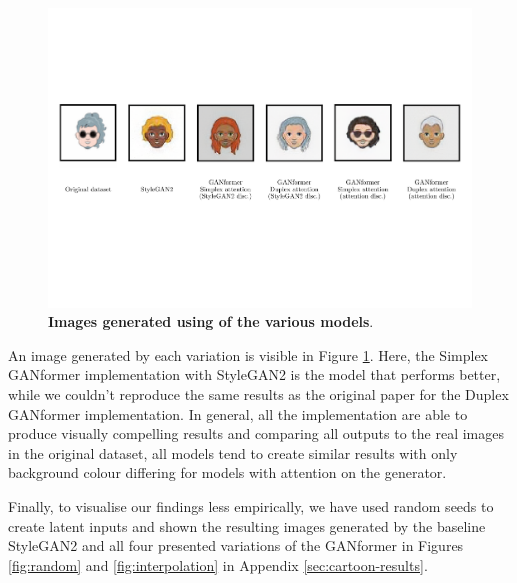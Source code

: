 \documentclass{article}
\begin{document}
\begin{figure}[htb]
	\centering
	\includegraphics[width=.9\linewidth]{imgAll}
	\caption{\textbf{Images generated using of the various models}.} 
	\label{fig:summaryImgs}
\end{figure}
An image generated by each variation is visible in Figure \ref{fig:summaryImgs}.
Here, the Simplex GANformer implementation with StyleGAN2 is the model that performs better, while we couldn't reproduce the same results as the original paper for the Duplex GANformer implementation. 
In general, all the implementation are able to produce visually compelling results and comparing all outputs to the real images in the original dataset, all models tend to create similar results with only background colour differing for models with attention on the generator.

Finally, to visualise our findings less empirically, we have used random seeds to create latent inputs and shown the resulting images generated by the baseline StyleGAN2 and all four presented variations of the GANformer in Figures \ref{fig:random} and \ref{fig:interpolation} in Appendix \ref{sec:cartoon-results}.
\end{document}
